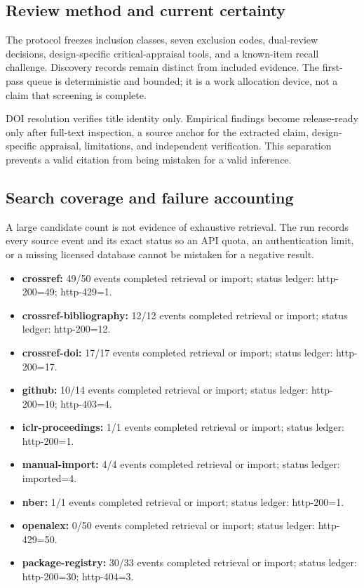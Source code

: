 \documentclass[11pt]{article}
\providecommand{\tightlist}{\setlength{\itemsep}{0pt}\setlength{\parskip}{0pt}}
\begin{document}
\hypertarget{review-method-and-current-certainty}{%
\subsection{Review method and current certainty}\label{review-method-and-current-certainty}}

The protocol freezes inclusion classes, seven exclusion codes, dual-review decisions, design-specific critical-appraisal tools, and a known-item recall challenge. Discovery records remain distinct from included evidence. The first-pass queue is deterministic and bounded; it is a work allocation device, not a claim that screening is complete.

DOI resolution verifies title identity only. Empirical findings become release-ready only after full-text inspection, a source anchor for the extracted claim, design-specific appraisal, limitations, and independent verification. This separation prevents a valid citation from being mistaken for a valid inference.

\hypertarget{search-coverage-and-failure-accounting}{%
\subsection{Search coverage and failure accounting}\label{search-coverage-and-failure-accounting}}

A large candidate count is not evidence of exhaustive retrieval. The run records every source event and its exact status so an API quota, an authentication limit, or a missing licensed database cannot be mistaken for a negative result.

\begin{itemize}
\tightlist
\item
  \textbf{crossref:} 49/50 events completed retrieval or import; status ledger: http-200=49; http-429=1.
\item
  \textbf{crossref-bibliography:} 12/12 events completed retrieval or import; status ledger: http-200=12.
\item
  \textbf{crossref-doi:} 17/17 events completed retrieval or import; status ledger: http-200=17.
\item
  \textbf{github:} 10/14 events completed retrieval or import; status ledger: http-200=10; http-403=4.
\item
  \textbf{iclr-proceedings:} 1/1 events completed retrieval or import; status ledger: http-200=1.
\item
  \textbf{manual-import:} 4/4 events completed retrieval or import; status ledger: imported=4.
\item
  \textbf{nber:} 1/1 events completed retrieval or import; status ledger: http-200=1.
\item
  \textbf{openalex:} 0/50 events completed retrieval or import; status ledger: http-429=50.
\item
  \textbf{package-registry:} 30/33 events completed retrieval or import; status ledger: http-200=30; http-404=3.
\end{itemize}
\end{document}
